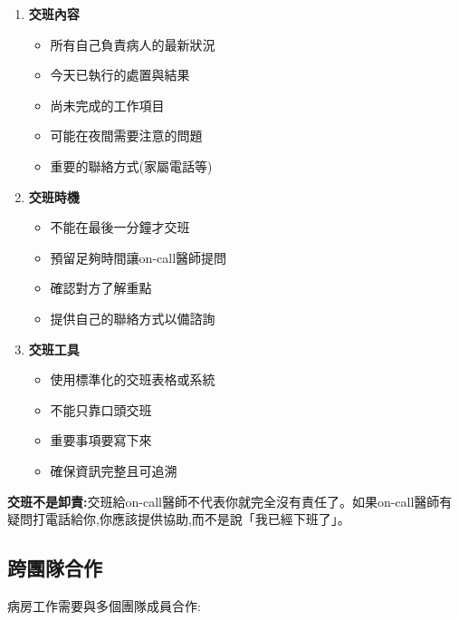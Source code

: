 \documentclass[12pt,a4paper]{article}
\newcommand{\note}[1]{
    \par
    \noindent
    \begin{tcolorbox}[
        colback=emergency_blue!5!white,
        colframe=emergency_blue,
        title=\textbf{重點提醒},
        fonttitle=\bfseries,
        boxrule=0.5pt,
        arc=3pt,
        left=6pt,
        right=6pt,
        top=6pt,
        bottom=6pt
    ]
    #1
    \end{tcolorbox}
}
\begin{document}
\begin{enumerate}[leftmargin=*]
\item \textbf{交班內容}
\begin{itemize}
\item 所有自己負責病人的最新狀況
\item 今天已執行的處置與結果
\item 尚未完成的工作項目
\item 可能在夜間需要注意的問題
\item 重要的聯絡方式(家屬電話等)
\end{itemize}

\item \textbf{交班時機}
\begin{itemize}
\item 不能在最後一分鐘才交班
\item 預留足夠時間讓on-call醫師提問
\item 確認對方了解重點
\item 提供自己的聯絡方式以備諮詢
\end{itemize}

\item \textbf{交班工具}
\begin{itemize}
\item 使用標準化的交班表格或系統
\item 不能只靠口頭交班
\item 重要事項要寫下來
\item 確保資訊完整且可追溯
\end{itemize}
\end{enumerate}

\note{
\textbf{交班不是卸責:}交班給on-call醫師不代表你就完全沒有責任了。如果on-call醫師有疑問打電話給你,你應該提供協助,而不是說「我已經下班了」。
}

\subsection{跨團隊合作}

病房工作需要與多個團隊成員合作:
\end{document}
